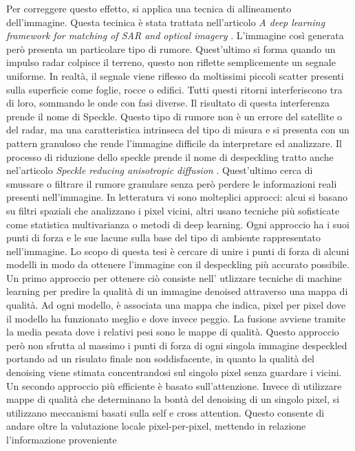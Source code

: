 Per correggere questo effetto, si applica una tecnica di allineamento dell’immagine. 
Questa tecinica è stata trattata nell'articolo \textit{A deep learning framework for matching of SAR and optical imagery} \cite{HUGHES2020166}.
L'immagine così generata però presenta un particolare tipo di rumore. Quest'ultimo si forma quando un impulso radar colpisce il terreno, 
questo non riflette semplicemente un segnale uniforme. In realtà, il segnale viene riflesso da 
moltissimi piccoli scatter presenti sulla superficie come foglie, rocce o edifici. Tutti questi 
ritorni interferiscono tra di loro, sommando le onde con fasi diverse. Il risultato di questa 
interferenza prende il nome di Speckle. Questo tipo di rumore non è un errore del satellite o 
del radar, ma una caratteristica intrinseca del tipo di misura e si presenta con un pattern granuloso
che rende l'immagine difficile da interpretare ed analizzare. Il processo di riduzione dello speckle 
prende il nome di despeckling tratto anche nel'articolo \textit{Speckle reducing anisotropic diffusion} \cite{1097762}. Quest'ultimo cerca di smussare o filtrare il rumore granulare senza 
però perdere le informazioni reali presenti nell'immagine. In letteratura vi sono molteplici 
approcci: alcui si basano su filtri spaziali che analizzano i pixel vicini, altri usano tecniche 
più sofisticate come statistica multivarianza o metodi di deep learning. Ogni approccio ha i suoi
punti di forza e le sue lacune sulla base del tipo di ambiente rappresentato nell'immagine. 
Lo scopo di questa tesi è cercare di unire i punti di forza di alcuni modelli in modo da ottenere l’immagine
con il despeckling più accurato possibile. Un primo approccio per ottenere ciò consiste nell' utlizzare tecniche di machine learning
per predire la qualità di un immagine denoised attraverso una mappa di qualità. Ad ogni modello,
è associata una mappa che indica, pixel per pixel dove il modello ha funzionato meglio e 
dove invece peggio. La fusione avviene tramite la media pesata dove i relativi pesi 
sono le mappe di qualità. Questo approccio però non sfrutta al massimo i punti di forza 
di ogni singola immagine despeckled portando ad un risulato finale non soddisfacente, 
in quanto la qualità del denoising viene stimata concentrandosi sul singolo pixel senza 
guardare i vicini. Un secondo approccio più efficiente è basato sull’attenzione. Invece 
di utilizzare mappe di qualità che determinano la bontà del denoising di un singolo 
pixel, si utilizzano meccanismi basati sulla self e cross attention. Questo consente di andare oltre 
la valutazione locale pixel-per-pixel, mettendo in relazione l’informazione proveniente 
